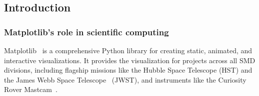 \documentclass[12pt]{article}
\numberwithin{page}{section}
\begin{document}
\subsection{Introduction}


\subsubsection{Matplotlib's role in scientific computing}



Matplotlib~\cite{Hunter:2007} is a comprehensive Python library for creating
static, animated, and interactive visualizations.  It provides the
visualization for projects across all SMD divisions, including flagship
missions like the Hubble Space Telescope (HST) and the James Webb Space
Telescope~\cite{jwst_pipeline} (JWST), and instruments like the Curiosity Rover
Mastcam~\cite{https://doi.org/10.1002/2016EA000219}.
\end{document}
